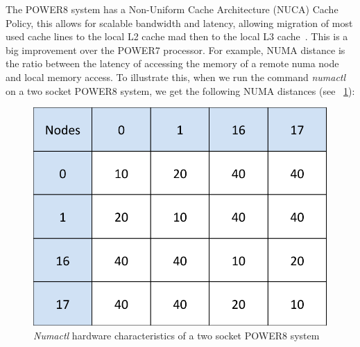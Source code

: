 The POWER8 system has a Non-Uniform Cache Architecture (NUCA) Cache Policy, this allows for scalable bandwidth and latency, allowing migration of most used cache lines to the local L2 cache mad then to the local L3 cache~\cite{IBM_P8}. This is a big improvement over the POWER7 processor. For example, NUMA distance is the ratio between the latency of accessing the memory of a remote numa node and local memory access. To illustrate this,  when we run the command \textit{numactl} on a two socket POWER8 system, we get the following 
NUMA distances (see ~\ref{fig:crest}): 

\begin{figure}[h]
  \centering
  \includegraphics[height=0.3\textwidth]{./Images/crest.pdf}
       \caption{\textit{Numactl} hardware characteristics of a two socket POWER8 system}
       \label{fig:crest}
\end{figure}




 